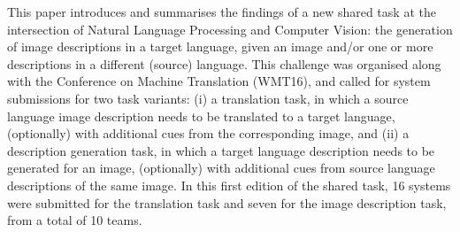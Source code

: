 This paper introduces and summarises the findings of a new shared task at the intersection of Natural Language Processing and Computer Vision: the generation of image descriptions in a target language, given an image and/or one or more descriptions in a different (source) language. This challenge was organised along with the Conference on Machine Translation (WMT16), and called for system submissions for two task variants: (i) a translation task, in which a source language image description needs to be translated to a target language, (optionally) with additional cues from the corresponding image, and (ii) a description generation task, in which a target language description needs to be generated for an image, (optionally) with additional cues from source language descriptions of the same image. In this first edition of the shared task, 16 systems were submitted for the translation task and seven for the image description task, from a total of 10 teams.
